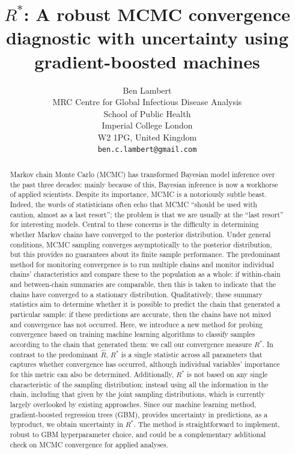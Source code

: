 \documentclass{article}
\title{$R^*$: A robust MCMC convergence diagnostic with uncertainty using gradient-boosted machines}
\author{%
	 Ben Lambert\\
	 MRC Centre for Global Infectious Disease Analysis\\
	 School of Public Health\\
	 Imperial College London\\
	 W2 1PG, United Kingdom\\
	 \texttt{ben.c.lambert@gmail.com} \\
}
\begin{document}

\maketitle

\begin{abstract}
	Markov chain Monte Carlo (MCMC) has transformed Bayesian model inference over the past three decades: mainly because of this, Bayesian inference is now a workhorse of applied scientists. Despite its importance, MCMC is a notoriously subtle beast. Indeed, the words of statisticians often echo that MCMC ``should be used with caution, almost as a last resort''; the problem is that we are usually at the ``last resort'' for interesting models. Central to these concerns is the difficulty in determining whether Markov chains have converged to the posterior distribution. Under general conditions, MCMC sampling converges asymptotically to the posterior distribution, but this provides no guarantees about its finite sample performance. The predominant method for monitoring convergence is to run multiple chains and monitor individual chains' characteristics and compare these to the population as a whole: if within-chain and between-chain summaries are comparable, then this is taken to indicate that the chains have converged to a stationary distribution. Qualitatively, these summary statistics aim to determine whether it is possible to predict the chain that generated a particular sample: if these predictions are accurate, then the chains have not mixed and convergence has not occurred. Here, we introduce a new method for probing convergence based on training machine learning algorithms to classify samples according to the chain that generated them: we call our convergence measure $R^*$. In contrast to the predominant $\hat{R}$, $R^*$ is a single statistic across all parameters that captures whether convergence has occurred, although individual variables' importance for this metric can also be determined. Additionally, $R^*$ is not based on any single characteristic of the sampling distribution; instead using all the information in the chain, including that given by the joint sampling distributions, which is currently largely overlooked by existing approaches. Since our machine learning method, gradient-boosted regression trees (GBM), provides uncertainty in predictions, as a byproduct, we obtain uncertainty in $R^*$. The method is straightforward to implement, robust to GBM hyperparameter choice, and could be a complementary additional check on MCMC convergence for applied analyses.
\end{abstract}
\end{document}
